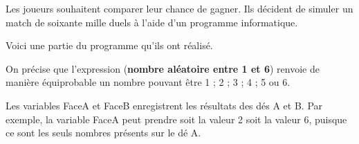 Les joueurs souhaitent comparer leur chance de gagner. Ils décident de simuler un match de
soixante mille duels à l'aide d'un programme informatique.
	
Voici une partie du programme qu'ils ont réalisé.


\medskip

On précise que l'expression (\textbf{nombre aléatoire entre 1 et 6}) renvoie de manière équiprobable un
nombre pouvant être 1 ; 2 ; 3 ; 4 ; 5 ou 6.
	
Les variables FaceA et FaceB enregistrent les résultats des dés A et B. Par exemple, la variable FaceA
peut prendre soit la valeur 2 soit la valeur 6, puisque ce sont les seuls nombres présents sur le dé A.
	
